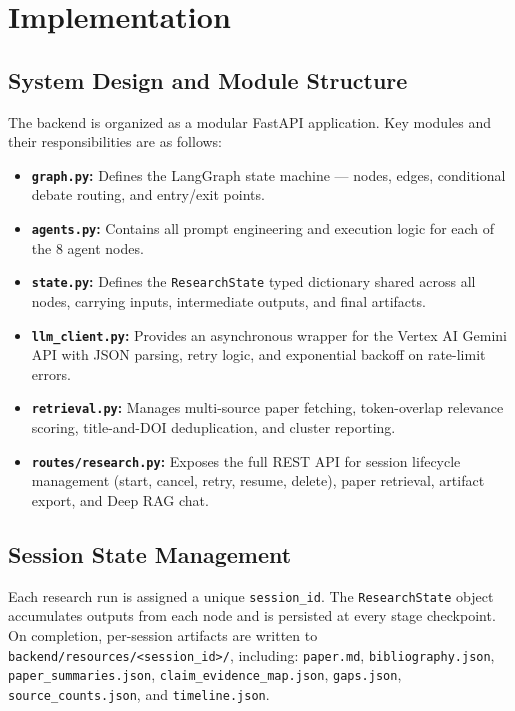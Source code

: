 \documentclass[12pt, a4paper]{article}
\begin{document}
\section{Implementation}

\subsection{System Design and Module Structure}

The backend is organized as a modular FastAPI application. Key modules and their
responsibilities are as follows:

\begin{itemize}[leftmargin=*, itemsep=3pt]
    \item \textbf{\texttt{graph.py}:} Defines the LangGraph state machine --- nodes, edges,
          conditional debate routing, and entry/exit points.
    \item \textbf{\texttt{agents.py}:} Contains all prompt engineering and execution logic
          for each of the 8 agent nodes.
    \item \textbf{\texttt{state.py}:} Defines the \texttt{ResearchState} typed dictionary
          shared across all nodes, carrying inputs, intermediate outputs, and final artifacts.
    \item \textbf{\texttt{llm\_client.py}:} Provides an asynchronous wrapper for the
          Vertex AI Gemini API with JSON parsing, retry logic, and exponential backoff on
          rate-limit errors.
    \item \textbf{\texttt{retrieval.py}:} Manages multi-source paper fetching,
          token-overlap relevance scoring, title-and-DOI deduplication, and cluster reporting.
    \item \textbf{\texttt{routes/research.py}:} Exposes the full REST API for session
          lifecycle management (start, cancel, retry, resume, delete), paper retrieval,
          artifact export, and Deep RAG chat.
\end{itemize}

\subsection{Session State Management}
Each research run is assigned a unique \texttt{session\_id}. The \texttt{ResearchState}
object accumulates outputs from each node and is persisted at every stage checkpoint.
On completion, per-session artifacts are written to
\texttt{backend/resources/<session\_id>/}, including:
\texttt{paper.md}, \texttt{bibliography.json}, \texttt{paper\_summaries.json},
\texttt{claim\_evidence\_map.json}, \texttt{gaps.json}, \texttt{source\_counts.json},
and \texttt{timeline.json}.
\end{document}
